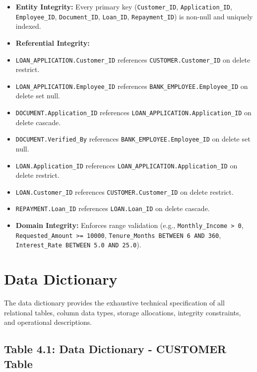 \begin{itemize}
  \item \textbf{Entity Integrity:} Every primary key (\texttt{Customer\_ID}, \texttt{Application\_ID}, \texttt{Employee\_ID}, \texttt{Document\_ID}, \texttt{Loan\_ID}, \texttt{Repayment\_ID}) is non-null and uniquely indexed.
  \item \textbf{Referential Integrity:}
  \item \texttt{LOAN\_APPLICATION.Customer\_ID} references \texttt{CUSTOMER.Customer\_ID} on delete restrict.
  \item \texttt{LOAN\_APPLICATION.Employee\_ID} references \texttt{BANK\_EMPLOYEE.Employee\_ID} on delete set null.
  \item \texttt{DOCUMENT.Application\_ID} references \texttt{LOAN\_APPLICATION.Application\_ID} on delete cascade.
  \item \texttt{DOCUMENT.Verified\_By} references \texttt{BANK\_EMPLOYEE.Employee\_ID} on delete set null.
  \item \texttt{LOAN.Application\_ID} references \texttt{LOAN\_APPLICATION.Application\_ID} on delete restrict.
  \item \texttt{LOAN.Customer\_ID} references \texttt{CUSTOMER.Customer\_ID} on delete restrict.
  \item \texttt{REPAYMENT.Loan\_ID} references \texttt{LOAN.Loan\_ID} on delete cascade.
  \item \textbf{Domain Integrity:} Enforces range validation (e.g., \texttt{Monthly\_Income > 0}, \texttt{Requested\_Amount >= 10000}, \texttt{Tenure\_Months BETWEEN 6 AND 360}, \texttt{Interest\_Rate BETWEEN 5.0 AND 25.0}).
\end{itemize}

\section{Data Dictionary}

The data dictionary provides the exhaustive technical specification of all relational tables, column data types, storage allocations, integrity constraints, and operational descriptions.

\subsection{Table 4.1: Data Dictionary - CUSTOMER Table}

